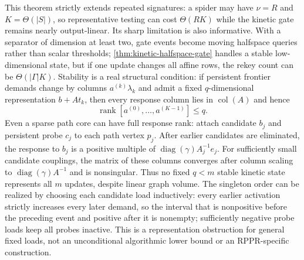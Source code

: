 This theorem strictly extends repeated signatures: a spider may have
$\nu=R$ and $K=\Theta(|S|)$, so representative testing can cost
$\Theta(RK)$ while the kinetic gate remains nearly output-linear.  Its sharp
limitation is also informative.  With a separator of dimension at least two,
gate events become moving halfspace queries rather than scalar thresholds;
\cref{thm:kinetic-halfspace-gate} handles a stable low-dimensional state, but
if one update changes all affine rows, the rekey count can be
$\Theta(|\Gamma|K)$.  Stability is a real structural condition: if persistent
frontier demands change by columns $a^{(k)}\lambda_k$ and admit a fixed
$q$-dimensional representation $b+At_k$, then every response column lies in
$\operatorname{col}(A)$ and hence
\begin{equation}
 \operatorname{rank}[a^{(0)},\ldots,a^{(K-1)}]\leq q.
 \label{eq:kinetic-response-rank}
\end{equation}
Even a sparse path core can have full response rank: attach candidate $b_j$
and persistent probe $c_j$ to each path vertex $p_j$.  After earlier
candidates are eliminated, the response to $b_j$ is a positive multiple of
$\operatorname{diag}(\gamma)A_j^{-1}e_j$.  For sufficiently small candidate
couplings, the matrix of these columns converges after column scaling to
$\operatorname{diag}(\gamma)A^{-1}$ and is nonsingular.  Thus no fixed
$q<m$ stable kinetic state represents all $m$ updates, despite linear graph
volume.  The singleton order can be realized by choosing each candidate load
inductively: every earlier activation strictly increases every later demand,
so the interval that is nonpositive before the preceding event and positive
after it is nonempty; sufficiently negative probe loads keep all probes
inactive.  This is a representation obstruction for general fixed loads, not
an unconditional algorithmic lower bound or an RPPR-specific construction.
